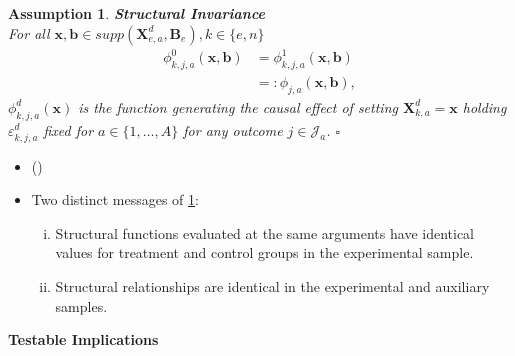 \documentclass[static]{JJH-Beamer}
\newtheorem{assumption}{Assumption}
\begin{document}
\begin{frame}

\begin{assumption} \label{ass:summary} \textbf{Structural Invariance}\\
For all $\bm{x}, \bm{b} \in supp(\bm{X}^d_{e,a}, \bm{B}_e), k \in \{e,n\}$
\begin{align}
\phi_{k,j,a}^0 \left( \bm{x}, \bm{b} \right) &= \phi_{k,j,a}^1 (\bm{x}, \bm{b}) \\   \nonumber
                                                                     &=: \phi_{j,a} (\bm{x}, \bm{b}),
\end{align}
$\phi^d_{k,j,a}(\bm{x})$ is the function generating the causal effect of setting $\bm{X}^d_{k,a}=\bm{x}$ holding $\varepsilon^d_{k,j,a}$ fixed for $a \in \{1,\dots,A\}$ for any outcome $j \in \mathcal{J}_{a}$. $\square$
\end{assumption}

\begin{itemize}
\item (\citealp{Frisch_1938_autonomy,Hurwicz_1962_structural})
\end{itemize}

\end{frame}

\begin{frame}

\begin{itemize}
\item Two distinct messages of \ref{ass:summary}:
    \begin{enumerate}[(i)]
    \item Structural functions evaluated at the same arguments have identical values for treatment and control groups in the experimental sample.
    \item Structural relationships are identical in the experimental and auxiliary samples.
    \end{enumerate}
\end{itemize}

\end{frame}

\begin{frame}

\begin{center}
\textbf{Testable Implications}
\end{center}

\end{frame}
\end{document}
